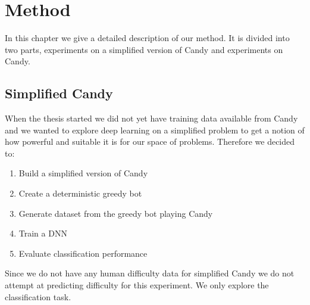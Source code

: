 \documentclass{kththesis}
\begin{document}
\chapter{Method}
In this chapter we give a detailed description of our method. It is divided into two parts, experiments on a simplified version of Candy and experiments on Candy.

\section{Simplified Candy}
When the  thesis started we did not yet have training data available from Candy and we wanted to  explore deep learning on a simplified problem  to get a notion of how powerful and suitable it is for our space of problems. Therefore we decided to:
\begin{enumerate}
\item Build a simplified version of Candy
\item Create a deterministic greedy bot
\item Generate dataset from the greedy bot playing Candy
\item Train a DNN
\item Evaluate classification performance
\end{enumerate}

Since we do not have any human difficulty data for simplified Candy we do not attempt at predicting difficulty for this experiment. We only explore the classification task.
\end{document}

